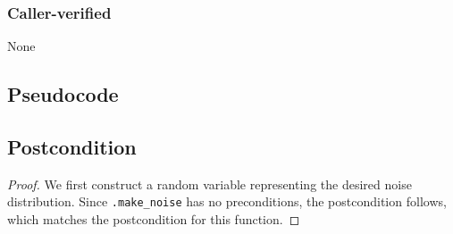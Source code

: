 \documentclass{article}
\begin{document}
\subsubsection*{Caller-verified}
None

\subsection*{Pseudocode}


\subsection*{Postcondition}
\begin{theorem}
\end{theorem}

\begin{proof}
    We first construct a random variable  representing the desired noise distribution.
    Since \texttt{.make\_noise} has no preconditions,
    the postcondition follows, which matches the postcondition for this function.
\end{proof}
\end{document}
